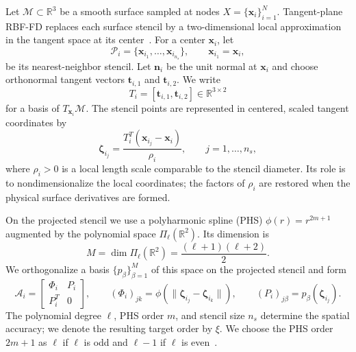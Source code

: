 \documentclass[a4paper,fleqn]{cas-sc}
\begin{document}
Let $\mathcal M\subset\mathbb R^3$ be a smooth surface sampled at nodes
$X=\{\bm x_i\}_{i=1}^N$.  Tangent-plane RBF-FD replaces each surface stencil
by a two-dimensional local approximation in the tangent space at its center~\cite{JonesBoslerKuberryWright2023,reeger_smooth,wright2023mgm}.
For a center $\bm x_i$, let
\[
  \mathcal P_i=\{\bm x_{i_1},\ldots,\bm x_{i_{n_s}}\},
  \qquad \bm x_{i_1}=\bm x_i,
\]
be its nearest-neighbor stencil.  Let $\bm n_i$ be the unit normal at
$\bm x_i$ and choose orthonormal tangent vectors $\bm t_{i,1}$ and
$\bm t_{i,2}$.  We write
\[
  T_i=[\bm t_{i,1},\bm t_{i,2}]\in\mathbb R^{3\times2}
\]
for a basis of $T_{\bm x_i}\mathcal M$.  The stencil points are represented in
centered, scaled tangent coordinates by
\begin{equation}
  \bm\zeta_{i_j}
  =
  \frac{T_i^T(\bm x_{i_j}-\bm x_i)}{\rho_i},
  \qquad j=1,\ldots,n_s,
  \label{eq:tp-coordinates}
\end{equation}
where $\rho_i>0$ is a local length scale comparable to the stencil diameter.
Its role is to nondimensionalize the local coordinates; the factors of
$\rho_i$ are restored when the physical surface derivatives are formed.

On the projected stencil we use a polyharmonic spline (PHS)
$\phi(r)=r^{2m+1}$ augmented by the polynomial space $\Pi_\ell(\mathbb R^2)$.  Its
dimension is
\[
  M=\dim\Pi_\ell(\mathbb R^2)=\frac{(\ell+1)(\ell+2)}{2}.
\]
We orthogonalize a basis $\{p_\beta\}_{\beta=1}^M$ of this space on the
projected stencil and form
\begin{equation}
  \mathcal A_i
  =
  \begin{bmatrix}
    \Phi_i & P_i\\
    P_i^T & 0
  \end{bmatrix},
  \qquad
  (\Phi_i)_{jk}=\phi(\|\bm\zeta_{i_j}-\bm\zeta_{i_k}\|),
  \qquad
  (P_i)_{j\beta}=p_\beta(\bm\zeta_{i_j}).
  \label{eq:tp-augmented-system}
\end{equation}
The polynomial degree $\ell$, PHS order $m$, and stencil size $n_s$ determine
the spatial accuracy; we denote the resulting target order by $\xi$. We choose the PHS order $2m+1$ as $\ell$ if $\ell$ is odd and $\ell-1$ if $\ell$ is even~\cite{shankar_hyperviscosity-based_2018}.
\end{document}
